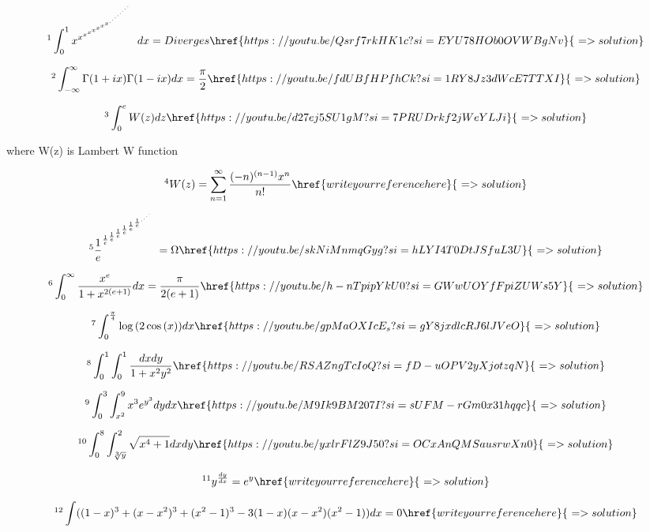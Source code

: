 \documentclass[12pt]{article}
\begin{document}
\[ \footnote{ The tower of x integral } \int_0^1 x^{x^{x^{x^{x^{x^{x^{x^{.^{.^{.^{.^{.^{.^{.^{.}}}}}}}}}}}}}}} dx   = Diverges \href{https://youtu.be/Qsrf7rkHK1c?si=EYU78HOb0OVWBgNv}{\,\,=>solution}   \]

\[ \footnote{ My take on your "A satisfying gamma function integral @maths505" } \int_{-\infty}^{\infty}\Gamma{(1+i x)}\Gamma{(1-ix)}dx=\frac{\pi}{2}  \href{https://youtu.be/fdUBfHPfhCk?si=1RY8Jz3dWcE7TTXI}{\,\,=>solution}   \]

\[   \footnote{ Integrating Lambert W function}  \int_0^e  W(z) dz  \href{https://youtu.be/d27ej5SU1gM?si=7PRUDrkf2jWeYLJi}{\,\,=>solution}   \]
\begin{center} where W(z) is Lambert W function  \end{center}

\[ \footnote{Deriving the series of Lambert W function} W(z)= \sum_{n=1}^{\infty} \frac{(-n)^{(n-1)} x^n}{n!}   \href{write your reference here}{\,\,=>solution}   \]

\[  \footnote{ The Tower of 1/e} {\frac{1}{e}^{\frac{1}{e}^{\frac{1}{e}^{\frac{1}{e}^{\frac{1}{e}^{\frac{1}{e}^{\frac{1}{e}^{.^{.^{.^{.}}}}}}}}}}}  = \Omega \href{https://youtu.be/skNiMnmqGyg?si=hLYI4T0DtJSfuL3U}{\,\,=>solution}    \]

\[  \footnote{Freaking Irrational Integral} \int_0^{\infty} \frac{x^e}{1+x^{2(e+1)}} dx  = \frac{\pi}{2(e+1)} \href{https://youtu.be/h-nTpipYkU0?si=GWwUOYfFpiZUWs5Y}{\,\,=>solution}   \]

\[ \footnote{Integration using Fourier Series} \int_0^{\frac{\pi}{4}} \log{(2\cos{(x)})} dx  \href{https://youtu.be/gpMaOXIcE_s?si=gY8jxdlcRJ6lJVeO}{\,\,=>solution}   \]

\[ \footnote{Most satisfying Double Integral } \int_0^1 \int_0^1 \frac{dx dy}{1+x^2y^2} \href{https://youtu.be/RSAZngTcIoQ?si=fD-uOPV2yXjotzqN}{\,\,=>solution}    \]

\[ \footnote{ I can solve the impossible Integral -i} \int_0^3 \int_{x^2}^9 x^3 e^{y^3} dy dx   \href{https://youtu.be/M9Ik9BM207I?si=sUFM-rGm0x31hqqc}{\,\,=>solution}    \]

\[ \footnote{ I can solve the impossible Integral - ii} \int_0^8 \int_{\sqrt[3]{y}}^2 \sqrt{x^4+1} dx dy  \href{https://youtu.be/yxlrFlZ9J50?si=OCxAnQMSausrwXn0}{\,\,=>solution}   \]

\[ \footnote{ Is that even possible?} y^{\frac{dy}{dx}} = e^y   \href{write your reference here}{\,\,=>solution}   \]

\[ \footnote{ MIT Integration Bee Qualifier Exam P10} \int ((1-x)^3+(x-x^2)^3+(x^2-1)^3-3(1-x)(x-x^2)(x^2-1)) dx  = 0    \href{write your reference here}{\,\,=>solution}   \]
\end{document}
